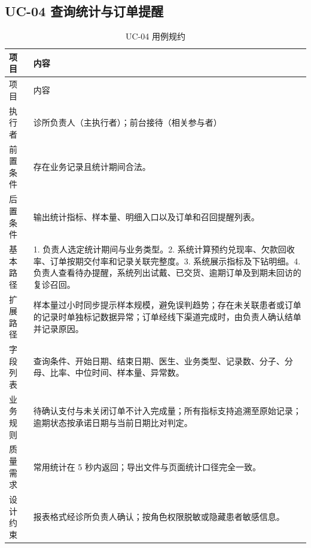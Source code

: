 \documentclass[UTF8,a4paper,12pt,fontset=fandol]{ctexart}
\begin{document}
\subsection{UC-04 查询统计与订单提醒}
\begin{longtable}{L{3.1cm}Z}
\caption{UC-04 用例规约}\label{tab:uc04}\\
\toprule 项目 & 内容 \\ \midrule
\endfirsthead
\toprule 项目 & 内容 \\ \midrule
\endhead
执行者 & 诊所负责人（主执行者）；前台接待（相关参与者） \\
前置条件 & 存在业务记录且统计期间合法。 \\
后置条件 & 输出统计指标、样本量、明细入口以及订单和召回提醒列表。 \\
基本路径 & 1. 负责人选定统计期间与业务类型。2. 系统计算预约兑现率、欠款回收率、订单按期交付率和记录关联完整度。3. 系统展示指标及下钻明细。4. 负责人查看待办提醒，系统列出试戴、已交货、逾期订单及到期未回访的复诊召回。 \\
扩展路径 & 样本量过小时同步提示样本规模，避免误判趋势；存在未关联患者或订单的记录时单独标记数据异常；订单经线下渠道完成时，由负责人确认结单并记录原因。 \\
字段列表 & 查询条件、开始日期、结束日期、医生、业务类型、记录数、分子、分母、比率、中位时间、样本量、异常数。 \\
业务规则 & 待确认支付与未关闭订单不计入完成量；所有指标支持追溯至原始记录；逾期状态按承诺日期与当前日期比对判定。 \\
质量需求 & 常用统计在 5 秒内返回；导出文件与页面统计口径完全一致。 \\
设计约束 & 报表格式经诊所负责人确认；按角色权限脱敏或隐藏患者敏感信息。 \\
\bottomrule
\end{longtable}

\end{document}
